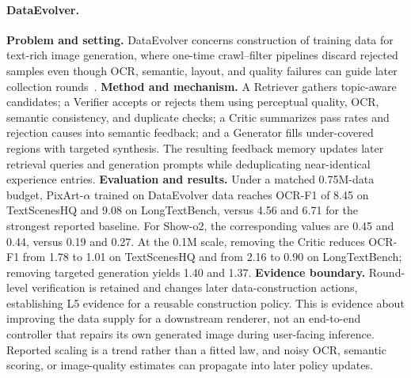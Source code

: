 \paragraph{DataEvolver.}
\textbf{Problem and setting.} DataEvolver concerns construction of training data for text-rich image generation, where one-time crawl--filter pipelines discard rejected samples even though OCR, semantic, layout, and quality failures can guide later collection rounds~\cite{avg260631537}. \textbf{Method and mechanism.} A Retriever gathers topic-aware candidates; a Verifier accepts or rejects them using perceptual quality, OCR, semantic consistency, and duplicate checks; a Critic summarizes pass rates and rejection causes into semantic feedback; and a Generator fills under-covered regions with targeted synthesis. The resulting feedback memory updates later retrieval queries and generation prompts while deduplicating near-identical experience entries. \textbf{Evaluation and results.} Under a matched 0.75M-data budget, PixArt-$\alpha$ trained on DataEvolver data reaches OCR-F1 of 8.45 on TextScenesHQ and 9.08 on LongTextBench, versus 4.56 and 6.71 for the strongest reported baseline. For Show-o2, the corresponding values are 0.45 and 0.44, versus 0.19 and 0.27. At the 0.1M scale, removing the Critic reduces OCR-F1 from 1.78 to 1.01 on TextScenesHQ and from 2.16 to 0.90 on LongTextBench; removing targeted generation yields 1.40 and 1.37. \textbf{Evidence boundary.} Round-level verification is retained and changes later data-construction actions, establishing L5 evidence for a reusable construction policy. This is evidence about improving the data supply for a downstream renderer, not an end-to-end controller that repairs its own generated image during user-facing inference. Reported scaling is a trend rather than a fitted law, and noisy OCR, semantic scoring, or image-quality estimates can propagate into later policy updates.

